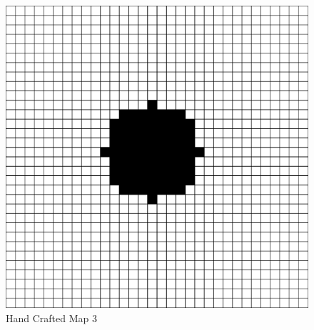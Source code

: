 \clearpage

\begin{figure}[h!]
    \centering
    \includegraphics[scale=0.82]{images/m6.png}
    \caption{Hand Crafted Map 3}
    \label{fig: rep_Hand Crafted Map 3}
\end{figure}

